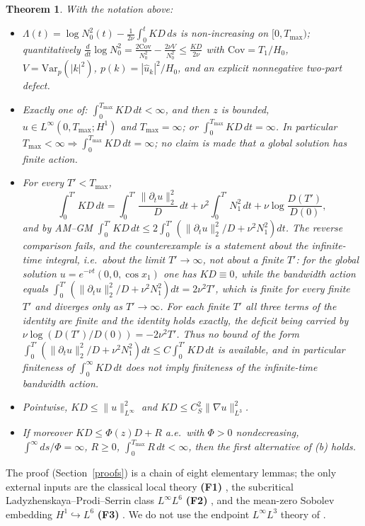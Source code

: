 \documentclass[11pt]{article}
\newtheorem{theorem}{Theorem}
\theoremstyle{definition}
\newcommand{\Cov}{\mathrm{Cov}}
\begin{document}
\begin{theorem}\label{main}
With the notation above:
\begin{itemize}
\item[(a)] $\displaystyle
\Lambda(t)=\log N_0^2(t)-\frac1{2\nu}\int_0^tKD\,ds$ is
non-increasing on $[0,T_{\max})$; quantitatively
$\frac{d}{dt}\log N_0^2=\frac{2\Cov}{N_0^2}-\frac{2\nu V}{N_0^2}
\le\frac{KD}{2\nu}$ with
$\Cov=T_1/H_0$, $V=\mathrm{Var}_p(|k|^2)$,
$p(k)=|\hat u_k|^2/H_0$, and an explicit nonnegative two-part defect.
\item[(b)] Exactly one of: $\int_0^{T_{\max}}KD\,dt<\infty$, and then
$z$ is bounded, $u\in L^\infty(0,T_{\max};H^1)$ and $T_{\max}=\infty$;
or $\int_0^{T_{\max}}KD\,dt=\infty$. In particular
$T_{\max}<\infty\Rightarrow\int_0^{T_{\max}}KD\,dt=\infty$; no claim
is made that a global solution has finite action.
\item[(c)] For every $T'<T_{\max}$,
\[
\int_0^{T'}KD\,dt=\int_0^{T'}\frac{\|\partial_tu\|_2^2}{D}\,dt
+\nu^2\int_0^{T'}N_1^2\,dt+\nu\log\frac{D(T')}{D(0)} ,
\]
and by AM--GM
$\int_0^{T'}KD\,dt\le2\int_0^{T'}(\|\partial_tu\|_2^2/D+\nu^2N_1^2)dt$.
The reverse comparison fails, and the counterexample is a statement
about the \emph{infinite-time} integral, i.e.\ about the limit
$T'\to\infty$, not about a finite $T'$: for the global solution
$u=e^{-\nu t}(0,0,\cos x_1)$ one has $KD\equiv0$, while the bandwidth
action equals $\int_0^{T'}(\|\partial_tu\|_2^2/D+\nu^2N_1^2)dt
=2\nu^2T'$, which is finite for every finite $T'$ and diverges only as
$T'\to\infty$. For each finite $T'$ all three terms of the identity are
finite and the identity holds exactly, the deficit being carried by
$\nu\log(D(T')/D(0))=-2\nu^2T'$. Thus no bound of the form
$\int_0^{T'}(\|\partial_tu\|_2^2/D+\nu^2N_1^2)dt\le
C\int_0^{T'}KD\,dt$ is available, and in particular finiteness of
$\int_0^\infty KD\,dt$ does not imply finiteness of the infinite-time
bandwidth action.
\item[(d)] Pointwise, $KD\le\|u\|_{L^\infty}^2$ and
$KD\le C_S^2\|\nabla u\|_{L^3}^2$.
\item[(e)] If moreover $KD\le\Phi(z)D+R$ a.e.\ with $\Phi>0$
nondecreasing, $\int^\infty ds/\Phi=\infty$, $R\ge0$,
$\int_0^{T_{\max}}R\,dt<\infty$, then the first alternative of (b)
holds.
\end{itemize}
\end{theorem}

The proof (Section~\ref{proofs}) is a chain of eight elementary lemmas;
the only external inputs are the classical local theory
\textbf{(F1)} \cite{FujitaKato1964,Kato1972,MajdaBertozzi,RRS2016},
the subcritical Ladyzhenskaya--Prodi--Serrin class $L^\infty L^6$
\textbf{(F2)} \cite{Prodi1959,Serrin1962,Ladyzhenskaya1967,RRS2016},
and the mean-zero Sobolev embedding $H^1\hookrightarrow L^6$
\textbf{(F3)} \cite{AdamsFournier}. We do not use the endpoint
$L^\infty L^3$ theory of \cite{ESS2003}.
\end{document}
